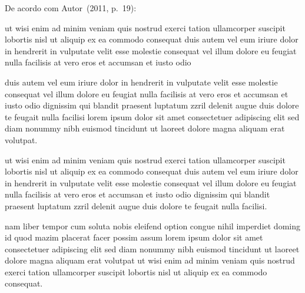 %
De acordo com Autor~(2011, p.~19):

\begin{directcite}
ut wisi enim ad minim veniam quis nostrud exerci tation ullamcorper suscipit
lobortis nisl ut aliquip ex ea commodo consequat duis autem vel eum iriure
dolor in hendrerit in vulputate velit esse molestie consequat vel illum
dolore eu feugiat nulla facilisis at vero eros et accumsan et
iusto odio
\end{directcite}

duis autem vel eum iriure dolor in hendrerit in vulputate velit esse
molestie consequat vel illum dolore eu feugiat nulla facilisis at vero eros
et accumsan et iusto odio dignissim qui blandit praesent luptatum zzril
delenit augue duis dolore te feugait nulla facilisi lorem ipsum dolor sit
amet consectetuer adipiscing elit sed diam nonummy nibh euismod tincidunt ut
laoreet dolore magna aliquam erat volutpat.

ut wisi enim ad minim veniam quis nostrud exerci tation ullamcorper suscipit
lobortis nisl ut aliquip ex ea commodo consequat duis autem vel eum iriure
dolor in hendrerit in vulputate velit esse molestie consequat vel illum
dolore eu feugiat nulla facilisis at vero eros et accumsan et iusto odio
dignissim qui blandit praesent luptatum zzril delenit augue duis dolore te
feugait nulla facilisi.

nam liber tempor cum soluta nobis eleifend option congue nihil imperdiet
doming id quod mazim placerat facer possim assum lorem ipsum dolor sit amet
consectetuer adipiscing elit sed diam nonummy nibh euismod tincidunt ut
laoreet dolore magna aliquam erat volutpat ut wisi enim ad minim veniam quis
nostrud exerci tation ullamcorper suscipit lobortis nisl ut aliquip ex ea
commodo consequat.
